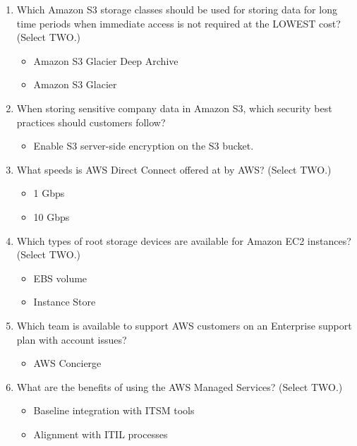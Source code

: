 \begin{enumerate}
	\item Which Amazon S3 storage classes should be used for storing data for long time periods when immediate access is not required at the LOWEST cost? (Select TWO.)

	\begin{itemize}
	\item Amazon S3 Glacier Deep Archive
	\item Amazon S3 Glacier
\end{itemize}

	\item When storing sensitive company data in Amazon S3, which security best practices should customers follow?

	\begin{itemize}
	\item Enable S3 server-side encryption on the S3 bucket.
\end{itemize}

	\item What speeds is AWS Direct Connect offered at by AWS? (Select TWO.)

	\begin{itemize}
	\item 1 Gbps
	\item 10 Gbps
\end{itemize}

	\item Which types of root storage devices are available for Amazon EC2 instances? (Select TWO.)

	\begin{itemize}
	\item EBS volume
	\item Instance Store
\end{itemize}

	\item Which team is available to support AWS customers on an Enterprise support plan with account issues?

	\begin{itemize}
	\item AWS Concierge
\end{itemize}

	\item What are the benefits of using the AWS Managed Services? (Select TWO.)

	\begin{itemize}
	\item Baseline integration with ITSM tools
	\item Alignment with ITIL processes
\end{itemize}


\end{enumerate}
